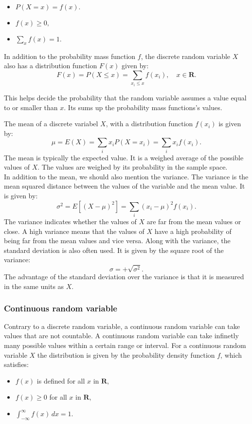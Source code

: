 \documentclass{article}
\begin{document}
	\begin{itemize}
		\item $P(X = x) = f(x).$
		\item $f(x) \geq 0,$
		\item $\sum_x f(x) = 1.$
	\end{itemize}
	
	In addition to the probability mass function $f$, the discrete random variable $X$ also has a distribution function $F(x)$ given by:
	$$F(x) = P(X \leq x) = \sum_{x_i \leq x} f(x_i), \quad x \in \textbf{R}.$$
	
	This helps decide the probability that the random variable assumes a value equal to or smaller than $x$. Its sums up the probability mass functions's values.
	\newline
	
	The mean of a discrete variabel $X$, with a distribution function $f(x_{i})$ is given by:
	$$\mu = E(X) = \sum_i x_i P(X = x_i) = \sum_i x_i f(x_i).$$
	The mean is typically the expected value. It is a weighed average of the possible values of $X$. The values are weighed by its probability in the sample space.
	\\
	 
	 In addition to the mean, we should also mention the variance. The variance is the mean squared distance between the values of the variable and the mean value. It is given by:
	 $$\sigma^2 = E\left[(X - \mu)^2\right] = \sum_{i} (x_i - \mu)^2 f(x_i).$$
	 The variance indicates whether the values of $X$ are far from the mean values or close. A high variance means that the values of $X$ have a high probability of being far from the mean values and vice versa. Along with the variance, the standard deviation is also often used. It is given by the square root of the variance:
	 $$\sigma=+\sqrt{\sigma^2}.$$
	 The advantage of the standard deviation over the variance is that it is measured in the same units as $X$.
	 
	\subsubsection{Continuous random variable}
	Contrary to a discrete random variable, a continuous random variable can take values that are not countable. A continuous random variable can take infinetly many possible values within a certain range or interval. For a continuous random variable $X$ the distribution is given by the probability density function $f$, which satisfies:
	
	\begin{itemize}
		\item $f(x)$ is defined for all $x$ in $\textbf{R}$,
		\item $f(x) \geq 0$ for all $x$ in $\textbf{R}$,
		\item $\int_{-\infty}^{\infty} f(x) \, dx = 1.$
	\end{itemize}
	
\end{document}
